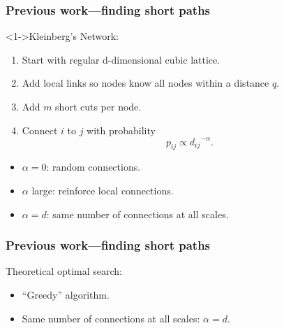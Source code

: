 \begin{frame}
  \frametitle{Previous work---finding short paths}

  \begin{block}<1->{Kleinberg's Network:}
    \begin{enumerate}
    \item<2->
      Start with
      regular d-dimensional cubic lattice.
    \item<3-> 
      Add local links so 
      nodes know all nodes within a distance $q$.
    \item<4->
      Add $m$ short cuts per node.
    \item<5->  
      Connect $i$ to $j$ with probability 
      $$ p_{ij} \propto {d_{ij}}^{-\alpha}. $$
    \end{enumerate}
  \end{block}

  \begin{itemize}
  \item<6-> 
    \alert{$\alpha=0$}: random connections.
  \item<6->  
    \alert{$\alpha$ large}: reinforce local connections.
  \item<6-> 
    \alert{$\alpha=d$}: same number of connections at all scales.
  \end{itemize}


\end{frame}

\begin{frame}
  \frametitle{Previous work---finding short paths}

  \begin{block}{Theoretical optimal search:}
    \begin{itemize}
    \item<1-> 
      ``Greedy'' algorithm.
    \item<2-> 
      Same number of connections at all scales: $\alpha=d$.
    \end{itemize}

    \bigskip


    \bigskip
    
  \end{block}
  

\end{frame}


